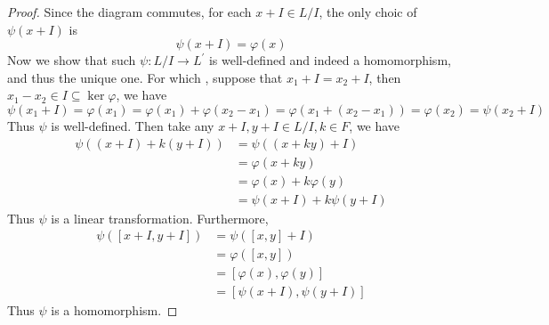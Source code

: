 \documentclass[../main.tex]{subfiles}
\begin{document}
\begin{proof}
     Since the diagram commutes, for each \(  x+ I\in L / I  \), the only choic of \(  \psi \left( x+ I \right)   \) is \[
     \psi \left( x+ I \right)=  \varphi \left( x \right)  
     \]  Now we show that such \(  \psi : L/I \to L^{\prime}   \) is well-defined and indeed a homomorphism, and thus the unique one. For which , suppose that \(  x_1+ I= x_2+ I  \), then \(  x_1-x_2\in I\subseteq \operatorname{ker} \varphi   \), we have \[
     \psi \left( x_1+ I \right)=  \varphi \left( x_1 \right)=  \varphi \left( x_1 \right)+  \varphi \left( x_2-x_1 \right)=  \varphi \left( x_1+ \left( x_2-x_1 \right)  \right)=  \varphi \left( x_2 \right)= \psi \left( x_2+ I \right)       
     \]   Thus \(  \psi   \) is well-defined. Then take any \(  x+ I, y+ I \in L / I, k \in F  \), we have \[
     \begin{aligned}
     \psi \left( \left( x+ I \right)+ k\left( y+ I \right)   \right)&= \psi \left( \left( x+ ky \right)+ I  \right)\\ 
      &=  \varphi \left( x+ ky \right)\\ 
       &=  \varphi \left( x \right)+ k \varphi \left( y \right)\\ 
        &= \psi \left( x+ I \right)+ k\psi \left( y+ I \right)        
     \end{aligned}
     \]Thus \(  \psi   \) is a linear transformation. Furthermore, \[
     \begin{aligned}
     \psi \left( [x+ I,y+ I] \right)&= \psi \left( [x,y]+ I \right)\\ 
      &=  \varphi \left( [x,y] \right)\\ 
       &= \left[  \varphi \left( x \right), \varphi \left( y \right)   \right]\\ 
        &= \left[ \psi \left( x+ I \right),\psi \left( y+ I \right)   \right]     
     \end{aligned} 
     \]   Thus \(  \psi   \) is a homomorphism. 
\end{proof}
\end{document}
